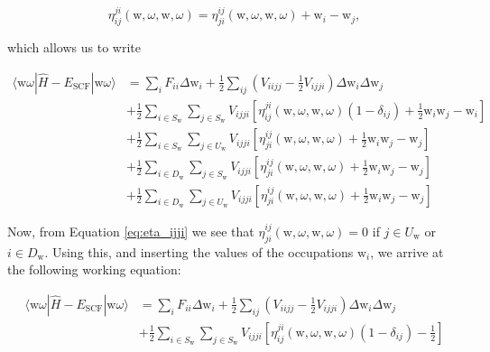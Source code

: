 \documentclass[12pt,a4paper]{report}
\begin{document}
\begin{equation}
  \eta_{ij}^{ji}(\text{w},\omega,\text{w},\omega) =
  \eta_{ji}^{ij}(\text{w},\omega,\text{w},\omega) + \text{w}_{i} -
  \text{w}_{j},
\end{equation}

\noindent
which allows us to write

\begin{equation}
  \begin{aligned}
    \langle \text{w} \omega | \hat{H} - E_{\text{SCF}} | \text{w}
    \omega \rangle &= \sum_{i} F_{ii} \Delta \text{w}_{i} +
    \frac{1}{2} \sum_{ij} \left( V_{iijj} - \frac{1}{2} V_{ijji}
    \right) \Delta \text{w}_{i} \Delta \text{w}_{j} \\
    &+ \frac{1}{2} \sum_{i \in S_{\text{w}}} \sum_{j \in S_{\text{w}}}
    V_{ijji} \left[ \eta_{ij}^{ji}(\text{w},\omega,\text{w},\omega)
      (1-\delta_{ij}) + \frac{1}{2} \text{w}_{i} \text{w}_{j} -
      \text{w}_{i} \right] \\
    &+ \frac{1}{2} \sum_{i \in S_{\text{w}}} \sum_{j \in U_{\text{w}}}
    V_{ijji} \left[ \eta_{ji}^{ij}(\text{w},\omega,\text{w},\omega) +
      \frac{1}{2} \text{w}_{i} \text{w}_{j} - \text{w}_{j} \right] \\
    &+ \frac{1}{2} \sum_{i \in D_{\text{w}}} \sum_{j \in S_{\text{w}}}
    V_{ijji} \left[ \eta_{ji}^{ij}(\text{w},\omega,\text{w},\omega) +
      \frac{1}{2} \text{w}_{i} \text{w}_{j} - \text{w}_{j} \right] \\
    &+ \frac{1}{2} \sum_{i \in D_{\text{w}}} \sum_{j \in U_{\text{w}}}
    V_{ijji} \left[ \eta_{ji}^{ij}(\text{w},\omega,\text{w},\omega) +
      \frac{1}{2} \text{w}_{i} \text{w}_{j} - \text{w}_{j} \right]
  \end{aligned}
\end{equation}

\noindent
Now, from Equation \ref{eq:eta_ijji} we see that
$\eta_{ji}^{ij}(\text{w},\omega,\text{w},\omega) = 0$ if $j \in
U_{\text{w}}$ or $i \in D_{\text{w}}$. Using this, and inserting the
values of the occupations $\text{w}_{i}$, we arrive at the following
working equation:

\begin{equation}\label{eq:hii_working}
  \begin{aligned}
    \langle \text{w} \omega | \hat{H} - E_{\text{SCF}} | \text{w}
    \omega \rangle &= \sum_{i} F_{ii} \Delta \text{w}_{i} +
    \frac{1}{2} \sum_{ij} \left( V_{iijj} - \frac{1}{2} V_{ijji}
    \right) \Delta \text{w}_{i} \Delta \text{w}_{j} \\
    &+ \frac{1}{2} \sum_{i \in S_{\text{w}}} \sum_{j \in S_{\text{w}}}
    V_{ijji} \left[ \eta_{ij}^{ji}(\text{w},\omega,\text{w},\omega)
      (1-\delta_{ij}) - \frac{1}{2} \right]
  \end{aligned}
\end{equation}
\end{document}
